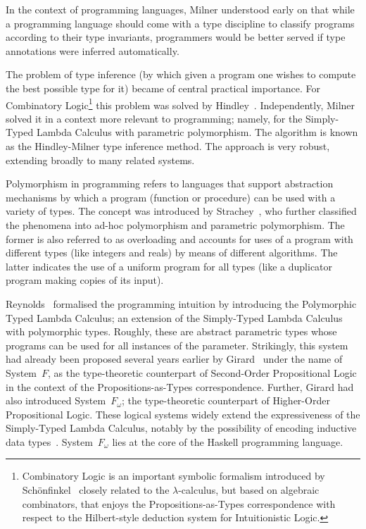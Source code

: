 \documentclass[11pt,twocolumn]{article}
\newcommand{\lcalculus}{\mbox{$\lambda$-calculus}}
\newcommand{\SystemF}{\mbox{System~$F$}}
\newcommand{\SystemFomega}{\mbox{System~$F_\omega$}}
\begin{document}
In the context of programming languages, Milner %
understood early on that while a programming language should come with a
type discipline to classify programs according to their type invariants,
programmers would be better served if type annotations were inferred
automatically.  

The problem of type inference (by which given a program one wishes to compute
the best possible type for it) became of central practical importance.  For
Combinatory Logic\footnote{Combinatory Logic is an important symbolic
  formalism introduced by Sch\"onfinkel~\cite{Schonfinkel} closely related
  to the {\lcalculus}, but based on algebraic combinators, that enjoys the
  Propositions-as-Types correspondence with respect to the Hilbert-style
  deduction system for Intuitionistic %
  Logic.} 
this problem was solved by Hindley~\cite{Hindley1969}.  Independently,
Milner~\cite{Milner1978} solved it in a context more relevant to
programming; namely, for the Simply-Typed Lambda Calculus with parametric
polymorphism.  The algorithm is known as the Hindley-Milner type
inference method.  The approach is very robust, extending broadly to
many related systems.
 
Polymorphism in programming refers to languages that support abstraction
mechanisms by which a program (function or procedure) can be used with a
variety of types.  The concept was introduced by Strachey~\cite{Strachey1967},
who further classified the phenomena into ad-hoc polymorphism and parametric polymorphism.
The former is also referred to as overloading and accounts for uses of a
program with different types (like integers and reals) by means of different
algorithms.  The latter indicates the use of a uniform program for all types
(like a duplicator program making copies of its input).

Reynolds~\cite{Reynolds} formalised the programming intuition by introducing
the Polymorphic Typed Lambda Calculus; an extension of the Simply-Typed Lambda
Calculus with polymorphic types.  Roughly, these are abstract parametric types
whose programs can be used for all instances of the parameter.  Strikingly,
this system had already been proposed several years earlier by
Girard~\cite{GirardSystemF} under the name of {\SystemF}, as the
type-theoretic counterpart of Second-Order Propositional Logic in the
context of the Propositions-as-Types correspondence.  Further, Girard had
also introduced {\SystemFomega}; the type-theoretic counterpart of
Higher-Order Propositional Logic.  These logical systems widely extend the
expressiveness of the Simply-Typed Lambda Calculus, notably by the
possibility of encoding inductive data types~\cite{BoehmBerarducci}.
{\SystemFomega} lies at the core of the Haskell programming
language. %
\end{document}
